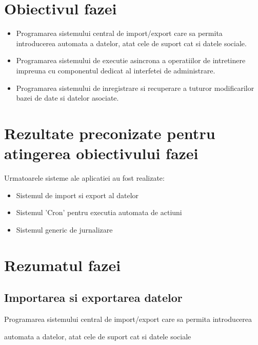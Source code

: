 \documentclass[a4paper, 10pt]{article}
\begin{document}
{\section{Obiectivul fazei}


\begin{itemize}
\item
Programarea sistemului central de import/export care sa permita introducerea
automata a datelor, atat cele de suport cat si datele sociale.

\item
Programarea sistemului de executie asincrona a operatiilor de intretinere
impreuna cu componentul dedicat al interfetei de administrare.

\item
Programarea sistemului de inregistrare si recuperare a tuturor modificarilor
bazei de date si datelor asociate.
\end{itemize}

\section{Rezultate preconizate pentru atingerea obiectivului fazei}

Urmatoarele sisteme ale aplicatiei au fost realizate:
\begin{itemize}
\item
Sistemul de import si export al datelor
\item
Sistemul 'Cron' pentru executia automata de actiuni
\item
Sistemul generic de jurnalizare
\end{itemize}

\section{Rezumatul fazei}

\medskip

\subsection*{Importarea si exportarea datelor}


\bigskip

Programarea sistemului central de import/export care sa permita introducerea

automata a datelor, atat cele de suport cat si datele sociale


}
\end{document}
